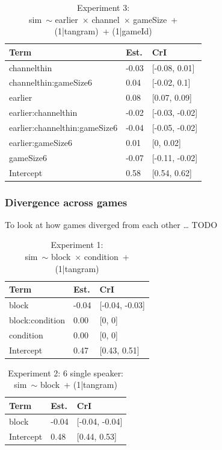 \documentclass[
  english,
  a4paper,
]{article}
\begin{document}
\begin{table}[h!]

\caption{\label{tab:unnamed-chunk-15}Experiment 3:\\ sim~$\sim$ earlier~$\times$ channel~$\times$ gameSize~+ (1|tangram)~+ (1|gameId)}
\centering
\begin{tabular}[t]{lll}
\toprule
Term & Est. & CrI\\
\midrule
channelthin & -0.03 & {}[-0.08, 0.01]\\
channelthin:gameSize6 & 0.04 & {}[-0.02, 0.1]\\
earlier & 0.08 & {}[0.07, 0.09]\\
earlier:channelthin & -0.02 & {}[-0.03, -0.02]\\
earlier:channelthin:gameSize6 & -0.04 & {}[-0.05, -0.02]\\
\addlinespace
earlier:gameSize6 & 0.01 & {}[0, 0.02]\\
gameSize6 & -0.07 & {}[-0.11, -0.02]\\
Intercept & 0.58 & {}[0.54, 0.62]\\
\bottomrule
\end{tabular}
\end{table}

\pagebreak

\hypertarget{divergence-across-games}{%
\subsubsection{Divergence across games}\label{divergence-across-games}}

To look at how games diverged from each other \ldots{} TODO

\begin{table}[h!]

\caption{\label{tab:unnamed-chunk-16}Experiment 1:\\ sim~$\sim$ block~$\times$ condition~+ (1|tangram)}
\centering
\begin{tabular}[t]{lll}
\toprule
Term & Est. & CrI\\
\midrule
block & -0.04 & {}[-0.04, -0.03]\\
block:condition & 0.00 & {}[0, 0]\\
condition & 0.00 & {}[0, 0]\\
Intercept & 0.47 & {}[0.43, 0.51]\\
\bottomrule
\end{tabular}
\end{table}

\begin{table}[h!]

\caption{\label{tab:unnamed-chunk-16}Experiment 2: 6 single speaker:\\ sim~$\sim$ block~+ (1|tangram)}
\centering
\begin{tabular}[t]{lll}
\toprule
Term & Est. & CrI\\
\midrule
block & -0.04 & {}[-0.04, -0.04]\\
Intercept & 0.48 & {}[0.44, 0.53]\\
\bottomrule
\end{tabular}
\end{table}
\end{document}
